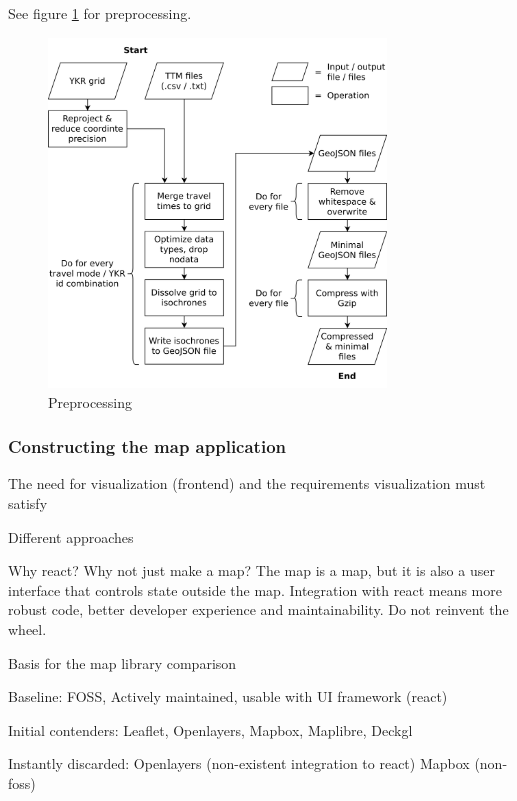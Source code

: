 
See figure \ref{fig:preprocessing} for preprocessing.

\begin{figure}[H]
	\centering
	\includegraphics[width=0.8\textwidth]{visual/figures/diagrams/preprocessing.png}
	\caption{Preprocessing}
	\label{fig:preprocessing}
\end{figure}


\subsubsection{Constructing the map application}

The need for visualization (frontend) and the requirements visualization must satisfy

Different approaches

Why react? Why not just make a map?
The map is a map, but it is also a user interface that controls state outside the map.
Integration with react means more robust code, better developer experience and maintainability.
Do not reinvent the wheel.

Basis for the map library comparison

Baseline: FOSS, Actively maintained, usable with UI framework (react)

Initial contenders: Leaflet, Openlayers, Mapbox, Maplibre, Deckgl

Instantly discarded: Openlayers (non-existent integration to react) Mapbox (non-foss)

